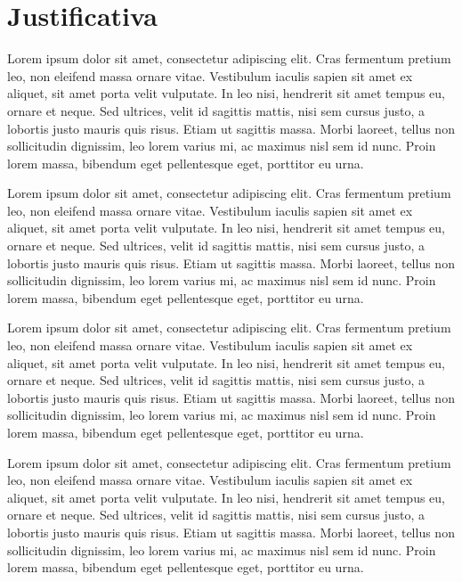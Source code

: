 \section{Justificativa}

Lorem ipsum dolor sit amet, consectetur adipiscing elit. Cras fermentum pretium leo, non eleifend massa ornare vitae. Vestibulum iaculis sapien sit amet ex aliquet, sit amet porta velit vulputate. In leo nisi, hendrerit sit amet tempus eu, ornare et neque. Sed ultrices, velit id sagittis mattis, nisi sem cursus justo, a lobortis justo mauris quis risus. Etiam ut sagittis massa. Morbi laoreet, tellus non sollicitudin dignissim, leo lorem varius mi, ac maximus nisl sem id nunc. Proin lorem massa, bibendum eget pellentesque eget, porttitor eu urna.

Lorem ipsum dolor sit amet, consectetur adipiscing elit. Cras fermentum pretium leo, non eleifend massa ornare vitae. Vestibulum iaculis sapien sit amet ex aliquet, sit amet porta velit vulputate. In leo nisi, hendrerit sit amet tempus eu, ornare et neque. Sed ultrices, velit id sagittis mattis, nisi sem cursus justo, a lobortis justo mauris quis risus. Etiam ut sagittis massa. Morbi laoreet, tellus non sollicitudin dignissim, leo lorem varius mi, ac maximus nisl sem id nunc. Proin lorem massa, bibendum eget pellentesque eget, porttitor eu urna.

Lorem ipsum dolor sit amet, consectetur adipiscing elit. Cras fermentum pretium leo, non eleifend massa ornare vitae. Vestibulum iaculis sapien sit amet ex aliquet, sit amet porta velit vulputate. In leo nisi, hendrerit sit amet tempus eu, ornare et neque. Sed ultrices, velit id sagittis mattis, nisi sem cursus justo, a lobortis justo mauris quis risus. Etiam ut sagittis massa. Morbi laoreet, tellus non sollicitudin dignissim, leo lorem varius mi, ac maximus nisl sem id nunc. Proin lorem massa, bibendum eget pellentesque eget, porttitor eu urna.

Lorem ipsum dolor sit amet, consectetur adipiscing elit. Cras fermentum pretium leo, non eleifend massa ornare vitae. Vestibulum iaculis sapien sit amet ex aliquet, sit amet porta velit vulputate. In leo nisi, hendrerit sit amet tempus eu, ornare et neque. Sed ultrices, velit id sagittis mattis, nisi sem cursus justo, a lobortis justo mauris quis risus. Etiam ut sagittis massa. Morbi laoreet, tellus non sollicitudin dignissim, leo lorem varius mi, ac maximus nisl sem id nunc. Proin lorem massa, bibendum eget pellentesque eget, porttitor eu urna.

